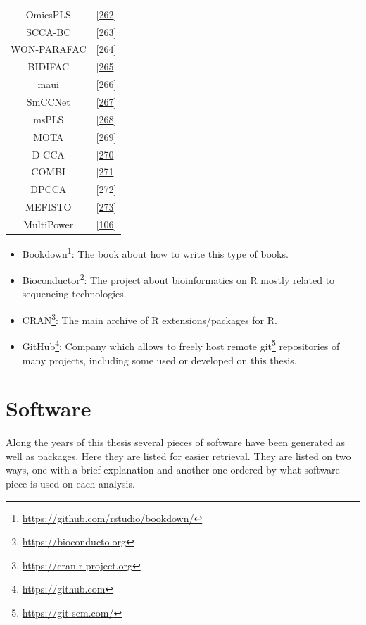 \documentclass[
  a4paper,
]{book}
\DeclareRobustCommand{\href}[2]{#2\footnote{\url{#1}}}
\begin{document}
\begin{longtable}[]{@{}cc@{}}
OmicsPLS & {[}\protect\hyperlink{ref-bouhaddani2018}{262}{]} \\
SCCA-BC & {[}\protect\hyperlink{ref-pimentel2018}{263}{]} \\
WON-PARAFAC & {[}\protect\hyperlink{ref-kim2019}{264}{]} \\
BIDIFAC & {[}\protect\hyperlink{ref-lock2020}{265}{]} \\
maui & {[}\protect\hyperlink{ref-ronen2019}{266}{]} \\
SmCCNet & {[}\protect\hyperlink{ref-shi2019}{267}{]} \\
msPLS & {[}\protect\hyperlink{ref-csala2020}{268}{]} \\
MOTA & {[}\protect\hyperlink{ref-fan2020}{269}{]} \\
D-CCA & {[}\protect\hyperlink{ref-shu2020}{270}{]} \\
COMBI & {[}\protect\hyperlink{ref-hawinkel2020}{271}{]} \\
DPCCA & {[}\protect\hyperlink{ref-gundersen2020}{272}{]} \\
MEFISTO & {[}\protect\hyperlink{ref-velten2020}{273}{]} \\
MultiPower & {[}\protect\hyperlink{ref-tarazona2020}{106}{]} \\
\bottomrule
\end{longtable}

\begin{itemize}
\item
  \href{https://github.com/rstudio/bookdown/}{Bookdown}: The book about how to write this type of books.
\item
  \href{https://bioconducto.org}{Bioconductor}: The project about bioinformatics on R mostly related to sequencing technologies.
\item
  \href{https://cran.r-project.org}{CRAN}: The main archive of R extensions/packages for R.
\item
  \href{https://github.com}{GitHub}: Company which allows to freely host remote \href{https://git-scm.com/}{git} repositories of many projects, including some used or developed on this thesis.
\end{itemize}

\hypertarget{software}{%
\chapter{Software}\label{software}}

Along the years of this thesis several pieces of software have been generated as well as packages.
Here they are listed for easier retrieval.
They are listed on two ways, one with a brief explanation and another one ordered by what software piece is used on each analysis.
\end{document}
